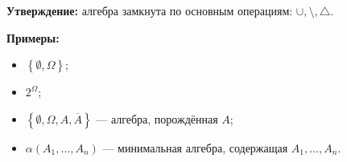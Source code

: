 \noindent \textbf{Утверждение:} алгебра замкнута по основным операциям: $\cup, \setminus, \triangle$.

\noindent\textbf{Примеры:}

\begin{itemize}
    \item $\left\{ \emptyset, \Omega \right\}$;
    \item $2^{\Omega}$;
    \item $\left\{ \emptyset, \Omega, A, \overline{A}\right\}$ --- алгебра, порождённая $A$;
    \item $\alpha\left( A_1, \ldots, A_n \right) $ --- минимальная алгебра, содержащая $A_1, \ldots, A_n$.
\end{itemize}